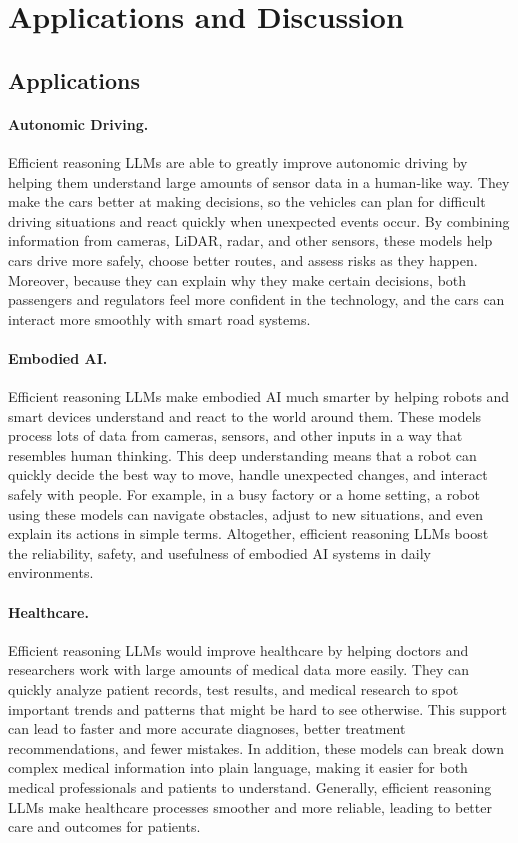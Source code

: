 \section{Applications and Discussion}

\subsection{Applications}

\paragraph{Autonomic Driving.} Efficient reasoning LLMs are able to greatly improve autonomic driving \cite{cui2024survey, xing2025openemma, xing2024autotrust, xing2025can} by helping them understand large amounts of sensor data in a human-like way. They make the cars better at making decisions, so the vehicles can plan for difficult driving situations and react quickly when unexpected events occur. By combining information from cameras, LiDAR, radar, and other sensors, these models help cars drive more safely, choose better routes, and assess risks as they happen. Moreover, because they can explain why they make certain decisions, both passengers and regulators feel more confident in the technology, and the cars can interact more smoothly with smart road systems.

\paragraph{Embodied AI.} Efficient reasoning LLMs make embodied AI \cite{duan2022survey} much smarter by helping robots and smart devices understand and react to the world around them. These models process lots of data from cameras, sensors, and other inputs in a way that resembles human thinking. This deep understanding means that a robot can quickly decide the best way to move, handle unexpected changes, and interact safely with people. For example, in a busy factory or a home setting, a robot using these models can navigate obstacles, adjust to new situations, and even explain its actions in simple terms. Altogether, efficient reasoning LLMs boost the reliability, safety, and usefulness of embodied AI systems in daily environments.

\paragraph{Healthcare.} Efficient reasoning LLMs would improve healthcare \cite{he2023survey} by helping doctors and researchers work with large amounts of medical data more easily. They can quickly analyze patient records, test results, and medical research to spot important trends and patterns that might be hard to see otherwise. This support can lead to faster and more accurate diagnoses, better treatment recommendations, and fewer mistakes. In addition, these models can break down complex medical information into plain language, making it easier for both medical professionals and patients to understand. Generally, efficient reasoning LLMs make healthcare processes smoother and more reliable, leading to better care and outcomes for patients.

